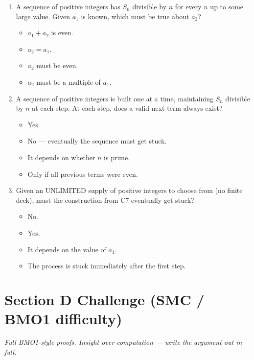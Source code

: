 \documentclass[11pt,a4paper]{article}
\begin{document}
\begin{enumerate}
\item A sequence of positive integers has $S_n$ divisible by $n$ for every $n$ up to some large value. Given $a_1$ is known, which must be true about $a_2$?
\begin{itemize}
\item[A)] $a_1+a_2$ is even.
\item[B)] $a_2=a_1$.
\item[C)] $a_2$ must be even.
\item[D)] $a_2$ must be a multiple of $a_1$.
\end{itemize}

\item A sequence of positive integers is built one at a time, maintaining $S_n$ divisible by $n$ at each step. At each step, does a valid next term always exist?
\begin{itemize}
\item[A)] Yes.
\item[B)] No --- eventually the sequence must get stuck.
\item[C)] It depends on whether $n$ is prime.
\item[D)] Only if all previous terms were even.
\end{itemize}

\item Given an UNLIMITED supply of positive integers to choose from (no finite deck), must the construction from C7 eventually get stuck?
\begin{itemize}
\item[A)] No.
\item[B)] Yes.
\item[C)] It depends on the value of $a_1$.
\item[D)] The process is stuck immediately after the first step.
\end{itemize}

\end{enumerate}

\section*{Section D \quad Challenge \hfill{\normalfont\small(SMC / BMO1 difficulty)}}

\noindent\textit{Full BMO1-style proofs. Insight over computation --- write the argument out in full.}
\end{document}
